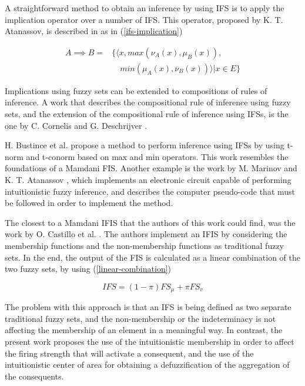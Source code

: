 \documentclass[conference]{IEEEtran}
\begin{document}
A straightforward method to obtain an inference by using IFS is to
apply the implication operator over a number of IFS. This operator,
proposed by K. T. Atanassov, is described in
\cite{atanassov2013intuitionistic} as in (\ref{ifs-implication})

\begin{equation}
  \label{ifs-implication}
  \begin{aligned}
  A \implies B = & \{ \langle x, max(\nu_{A} (x), \mu_{B}(x)),\\
  &\quad min(\mu_{A} (x), \nu_{B} (x)) \rangle | x \in E \}
\end{aligned}
\end{equation}

Implications using fuzzy sets can be extended to compositions of rules of
inference. A work that describes the compositional rule of inference
using fuzzy sets, and the extension of the compositional rule of
inference using IFSs, is the one by C. Cornelis and G. Deschrijver
\cite{cornelis2001compositional}.

H. Bustince et al. \cite{bustince1995method} propose a method to
perform inference using IFSs by using t-norm and t-conorm based on max
and min operators. This work resembles the foundations of a Mamdani
FIS. Another example is the work by M. Marinov and K. T. Atanassov
\cite{marinov2005method}, which implements an electronic circuit
capable of performing intuitionistic fuzzy inference, and describes
the computer pseudo-code that must be followed in order to implement
the method.

The closest to a Mamdani IFIS that the authors of this work could
find, was the work by O. Castillo et
al. \cite{castillo2007intuitionistic}. The authors implement an IFIS
by considering the membership functions and the non-membership
functions as traditional fuzzy sets. In the end, the output of the FIS
is calculated as a linear combination of the two fuzzy sets, by using
(\ref{linear-combination})

\begin{equation}
  \label{linear-combination}
  IFS = (1-\pi)FS_{\mu} + \pi FS_{v}
\end{equation}

The problem with this approach is that an IFS is being defined as two
separate traditional fuzzy sets, and the non-membership or the
indeterminacy is not affecting the membership of an element in a
meaningful way. In contrast, the present work proposes the use of the
intuitionistic membership in order to affect the firing strength that
will activate a consequent, and the use of the intuitionistic center
of area for obtaining a defuzzification of the aggregation of the
consequents.
\end{document}

